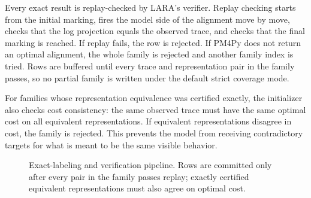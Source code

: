 \documentclass[11pt]{article}
\begin{document}
Every exact result is replay-checked by LARA's verifier. Replay checking starts
from the initial marking, fires the model side of the alignment move by move,
checks that the log projection equals the observed trace, and checks that the
final marking is reached. If replay fails, the row is rejected. If PM4Py does
not return an optimal alignment, the whole family is rejected and another
family index is tried. Rows are buffered until every trace and representation pair
in the family passes, so no partial family is written under the default strict
coverage mode.

For families whose representation equivalence was certified exactly, the
initializer also checks cost consistency: the same observed trace must have the
same optimal cost on all equivalent representations. If equivalent
representations disagree in cost, the family is rejected. This prevents the
model from receiving contradictory targets for what is meant to be the same
visible behavior.

\begin{figure}[htbp]
\centering
{}
\caption{Exact-labeling and verification pipeline. Rows are committed only
after every pair in the family passes replay; exactly certified equivalent
representations must also agree on optimal cost.}
\label{fig:exact-labeling}
\end{figure}
\end{document}
